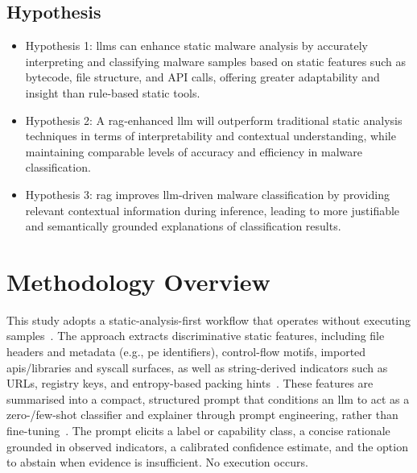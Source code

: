\subsection{Hypothesis}\label{subsec:Hypothesis}
\begin{itemize}
	\item Hypothesis 1: \glspl{llm} can enhance static malware analysis by accurately interpreting and
	      classifying malware samples based on static features such as bytecode, file structure, and API
	      calls, offering greater adaptability and insight than rule-based static tools.
	\item Hypothesis 2: A \gls{rag}-enhanced \gls{llm} will outperform traditional static analysis techniques
	      in terms of interpretability and contextual understanding, while maintaining comparable levels of
	      accuracy and efficiency in malware classification.
	\item Hypothesis 3: \gls{rag} improves \gls{llm}-driven malware classification by providing relevant
	      contextual information during inference, leading to more justifiable and semantically grounded
	      explanations of classification results.
\end{itemize}

\section{Methodology Overview}\label{sec:MethodologyOverview}
This study adopts a static-analysis-first workflow that operates without executing
samples~\cite{fedak2020fundamentals}. The approach extracts discriminative static features,
including file headers and metadata (e.g., \gls{pe} identifiers), control-flow motifs, imported
\glspl{api}/libraries and syscall surfaces, as well as string-derived indicators such as URLs,
registry keys, and entropy-based packing hints~\cite{anderson2018ember}. These features are
summarised into a compact, structured prompt that conditions an \gls{llm} to act as a
zero-/few-shot classifier and explainer through prompt engineering, rather than
fine-tuning~\cite{brown2020fewshot,wahle2024paraphrase}. The prompt elicits a label or capability
class, a concise rationale grounded in observed indicators, a calibrated confidence estimate, and
the option to abstain when evidence is insufficient. No execution occurs.

